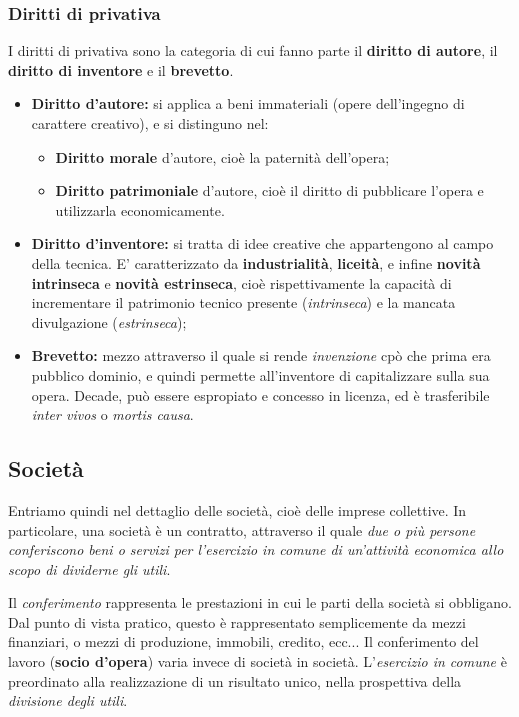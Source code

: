 \documentclass[a4paper,11pt]{article}
\begin{document}
\subsubsection{Diritti di privativa}
I diritti di privativa sono la categoria di cui fanno parte il \textbf{diritto di autore}, il \textbf{diritto di inventore} e il \textbf{brevetto}.
\begin{itemize}
	\item \textbf{Diritto d'autore:} si applica a beni immateriali (opere dell'ingegno di carattere creativo), e si distinguno nel:
		\begin{itemize}
			\item \textbf{Diritto morale} d'autore, cioè la paternità dell'opera;
			\item \textbf{Diritto patrimoniale} d'autore, cioè il diritto di pubblicare l'opera e utilizzarla economicamente.
		\end{itemize}
	\item \textbf{Diritto d'inventore:} si tratta di idee creative che appartengono al campo della tecnica. E' caratterizzato da \textbf{industrialità}, \textbf{liceità}, e infine \textbf{novità intrinseca} e \textbf{novità estrinseca}, cioè rispettivamente la capacità di incrementare il patrimonio tecnico presente (\textit{intrinseca}) e la mancata divulgazione (\textit{estrinseca});
	\item \textbf{Brevetto:} mezzo attraverso il quale si rende \textit{invenzione} cpò che prima era pubblico dominio, e quindi permette all'inventore di capitalizzare sulla sua opera. Decade, può essere espropiato e concesso in licenza, ed è trasferibile \textit{inter vivos} o \textit{mortis causa}.
\end{itemize}

\subsection{Società}
Entriamo quindi nel dettaglio delle società, cioè delle imprese collettive.
In particolare, una società è un contratto, attraverso il quale \textit{due o più persone conferiscono beni o servizi per l'esercizio in comune di un'attività economica allo scopo di dividerne gli utili}.

Il \textit{conferimento} rappresenta le prestazioni in cui le parti della società si obbligano.
Dal punto di vista pratico, questo è rappresentato semplicemente da mezzi finanziari, o mezzi di produzione, immobili, credito, ecc...
Il conferimento del lavoro (\textbf{socio d'opera}) varia invece di società in società.
L'\textit{esercizio in comune} è preordinato alla realizzazione di un risultato unico, nella prospettiva della \textit{divisione degli utili}. 
\end{document}
